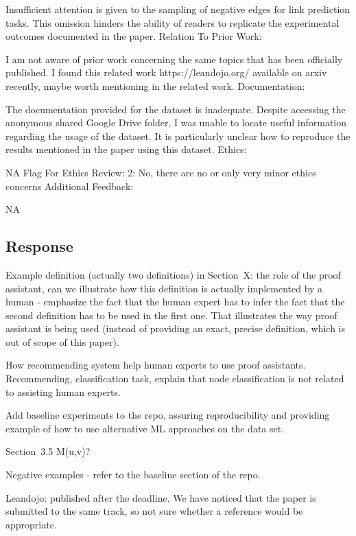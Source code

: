 \documentclass{article}
\begin{document}
Insufficient attention is given to the sampling of negative edges for link prediction tasks. This omission hinders the ability of readers to replicate the experimental outcomes documented in the paper.
Relation To Prior Work:

I am not aware of prior work concerning the same topics that has been officially published. I found this related work https://leandojo.org/ available on arxiv recently, maybe worth mentioning in the related work.
Documentation:

The documentation provided for the dataset is inadequate. Despite accessing the anonymous shared Google Drive folder, I was unable to locate useful information regarding the usage of the dataset. It is particularly unclear how to reproduce the results mentioned in the paper using this dataset.
Ethics:

NA
Flag For Ethics Review: 2: No, there are no or only very minor ethics concerns
Additional Feedback:

NA

\subsection{Response}

Example definition (actually two definitions) in Section~X: the role of the proof assistant, can we illustrate how this definition is actually implemented by a human - emphasize the fact that the human expert has to infer the fact that the second definition has to be used in the first one. That illustrates the way proof assistant is being used (instead of providing an exact, precise definition, which is out of scope of this paper).

How recommending system help human experts to use proof assistants. Recommending, classification task, explain that node classification is not related to assisting human experts.

Add baseline experiments to the repo, assuring reproducibility and providing example of how to use alternative ML approaches on the data set.

Section~3.5 M(u,v)?

Negative examples - refer to the baseline section of the repo.

Leandojo: published after the deadline. We have noticed that the paper is submitted to the same track, so not sure whether a reference would be appropriate.
\end{document}

